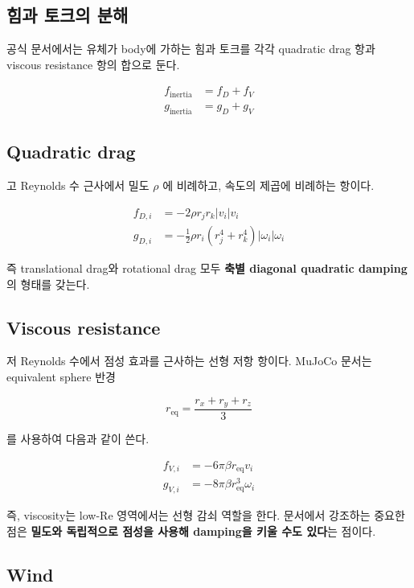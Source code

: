\documentclass[11pt,a4paper]{article}
\begin{document}
\subsection{힘과 토크의 분해}

공식 문서에서는 유체가 body에 가하는 힘과 토크를 각각 quadratic drag 항과 viscous resistance 항의 합으로 둔다.

\begin{align}
f_{\text{inertia}} &= f_D + f_V \\
g_{\text{inertia}} &= g_D + g_V
\end{align}

\subsection{Quadratic drag}

고 Reynolds 수 근사에서 밀도 $\rho$ 에 비례하고, 속도의 제곱에 비례하는 항이다.

\begin{align}
f_{D,i} &= -2 \rho r_j r_k |v_i| v_i \\
g_{D,i} &= -\frac{1}{2}\rho r_i \left(r_j^4 + r_k^4\right)|\omega_i|\omega_i
\end{align}

즉 translational drag와 rotational drag 모두 \textbf{축별 diagonal quadratic damping}의 형태를 갖는다.

\subsection{Viscous resistance}

저 Reynolds 수에서 점성 효과를 근사하는 선형 저항 항이다. MuJoCo 문서는 equivalent sphere 반경

\begin{equation}
r_{\text{eq}} = \frac{r_x + r_y + r_z}{3}
\end{equation}

를 사용하여 다음과 같이 쓴다.

\begin{align}
f_{V,i} &= -6 \pi \beta r_{\text{eq}} v_i \\
g_{V,i} &= -8 \pi \beta r_{\text{eq}}^3 \omega_i
\end{align}

즉, viscosity는 low-Re 영역에서는 선형 감쇠 역할을 한다. 문서에서 강조하는 중요한 점은 \textbf{밀도와 독립적으로 점성을 사용해 damping을 키울 수도 있다}는 점이다.

\subsection{Wind}
\end{document}
